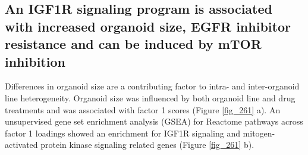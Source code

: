 \begin{flushleft}
\newpage
\subsection{An IGF1R signaling program is associated with increased organoid size, EGFR inhibitor resistance and can be induced by mTOR inhibition}

Differences in organoid size are a contributing factor to intra- and inter-organoid line heterogeneity. Organoid size was influenced by both organoid line and drug treatments and was associated with factor 1 scores (Figure \ref{fig_261} a). An unsupervised gene set enrichment analysis (GSEA) for Reactome pathways across factor 1 loadings showed an enrichment for IGF1R signaling and mitogen-activated protein kinase signaling related genes (Figure \ref{fig_261} b). 


\end{flushleft}
